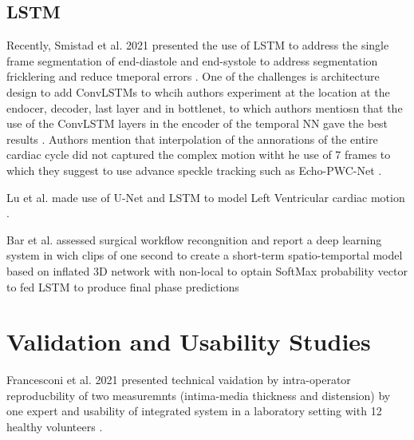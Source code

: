 



\subsection{LSTM}
Recently, Smistad et al. 2021 presented the use of LSTM to address the single frame segmentation of end-diastole and end-systole to address segmentation fricklering and reduce tmeporal errors \cite{smistad2021-C-IUS}.
One of the challenges is architecture design to add ConvLSTMs to whcih authors experiment at the location at the endocer, decoder, last layer and in bottlenet, to which authors mentiosn that the use of the ConvLSTM layers in the encoder of the temporal NN gave the best results \cite{smistad2021-C-IUS}.
Authors mention that interpolation of the annorations of the entire cardiac cycle did not captured the complex motion witht he use of 7 frames to which they suggest to use advance speckle tracking such as Echo-PWC-Net  \cite{ostvik2021-TMI}.

Lu et al. made use of U-Net and LSTM to model Left Ventricular cardiac motion \cite{lu2020-MIUA}.

Bar et al. assessed surgical workflow recongnition and report a deep learning system in wich clips of one second to create a short-term spatio-temportal model based on inflated 3D network with non-local to optain SoftMax probability vector to fed LSTM to produce final phase predictions \cite{Bar2020}

\section{Validation and Usability Studies}
Francesconi et al. 2021 presented technical vaidation by intra-operator reproducbility of two measuremnts (intima-media thickness and distension) by one expert and usability of integrated system in a laboratory setting with 12 healthy volunteers \cite{francesconi2021}.

